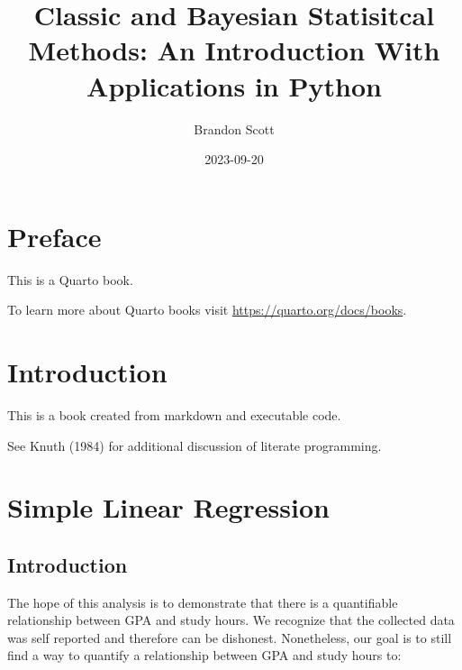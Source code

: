 \documentclass[
  letterpaper,
  DIV=11,
  numbers=noendperiod]{scrreprt}
\title{Classic and Bayesian Statisitcal Methods: An Introduction With
Applications in Python}
\author{Brandon Scott}
\date{2023-09-20}
\renewcommand*\contentsname{Table of contents}
\newcommand\contentsname{Table of contents}
\begin{document}
\maketitle
\ifdefined\Shaded\renewenvironment{Shaded}{\begin{tcolorbox}[sharp corners, breakable, interior hidden, borderline west={3pt}{0pt}{shadecolor}, boxrule=0pt, enhanced, frame hidden]}{\end{tcolorbox}}\fi

\renewcommand*\contentsname{Table of contents}
{
\hypersetup{linkcolor=}
\setcounter{tocdepth}{2}
\tableofcontents
}

\hypertarget{preface}{%
\chapter*{Preface}\label{preface}}


This is a Quarto book.

To learn more about Quarto books visit
\url{https://quarto.org/docs/books}.


\hypertarget{introduction}{%
\chapter{Introduction}\label{introduction}}

This is a book created from markdown and executable code.

See Knuth (1984) for additional discussion of literate programming.


\hypertarget{simple-linear-regression}{%
\chapter{Simple Linear Regression}\label{simple-linear-regression}}

\hypertarget{introduction-1}{%
\section{Introduction}\label{introduction-1}}

The hope of this analysis is to demonstrate that there is a quantifiable
relationship between GPA and study hours. We recognize that the
collected data was self reported and therefore can be dishonest.
Nonetheless, our goal is to still find a way to quantify a relationship
between GPA and study hours to:
\end{document}
